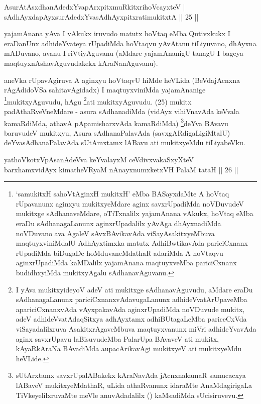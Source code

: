\begin{shl}
AsurAtAsxdhanAdedxYvapArxpitxmuRkitxrihoVcayxteV |\\
sAdhAyxdapAyxsurAdedxYvasAdhAyxpitxratimukitxtA \hfill || 25 ||
\end{shl}

\begin{artha}
yajamAnana yAva I vAkukx iruvudo matutx hoVtaq eMba Qutivxkukx I eraDanUnx adhideYvateya rUpadiMda hoVtaqvu yAvAtanu tiLiyuvano, dhAyxna mADuvano, avanu I riVtiyAguvanu (aMdare yajamAnanigU tanagU I bageya maqtuyxnAshavAguvudakekx kAraNanAguvanu).
\end{artha}

\begin{artha}
aneVka rUpavAgiruva A aginxyu hoVtaqvU hiMde heVLida (BeVdajAcnxna rAgAdidoVSa sahitavAgidadx) I maqtuyxviniMda yajamAnanige \footnote{`samukitxH sahoVtA\s ginxH mukitxH' eMba BASayxdaMte A hoVtaq rUpavanunx aginxyu mukitxyeMdare aginx savxrUpadiMda noVDuvudeV mukitxge sAdhanaveMdare, oTiTxnalilx yajamAnana vAkukx, hoVtaq eMba eraDu sAdhanagaLanunx aginxrUpadalilx yAvAga dhAyxnadiMda noVDuvano ava AgaleV sAvxBAvikavAda viSayAsakitxyeMbuva maqtuyxviniMdalU AdhAyxtimxka matutx AdhiBwtikavAda pariciCxnanx rUpadiMda biDugaDe hoMduvaneMdathaR adariMda A hoVtaqvu aginxrUpadiMda kaMDalilx yajamAnana maqtuyxveMba pariciCxnanx budidhxyiMda mukitxyAgalu sAdhanavAguvanu.}mukitxyAguvudu, hAgu \footnote{I yAva mukitxyideyoV adeV ati mukitxge sAdhanavAguvudu, aMdare eraDu sAdhanagaLanunx pariciCxnanxvAdavugaLanunx adhideVvatArUpaveMba apariciCxnanxvAda vAyxpakavAda aginxrUpadiMda noVDuvude mukitx, adeV adhideVvatAdaqSitxya adhAyxtamx adhiBUtagaLeMba pariceCxVda viSayadalilxruva AsakitxrAgaveMbuva maqtuyxvanunx miVri adhideYvavAda aginx savxrUpavu laBisuvudeMba PalarUpa BAvaveV ati mukitx, kAyaRkAraNa BAvadiMda aupacArikavAgi mukitxyeV ati mukitxyeMdu heVLide.}ati mukitxyAguvudu. (25) mukitx padAthaRveVneMdare - asura sAdhanadiMda (vidAyx vihiVnavAda keVvala kamaRdiMda, athavA pApamisharxvAda kamaRdiMda) \footnote{sUtArxtamx savxrUpalABakekx kAraNavAda jAcnxnakamaR samucacxya lABaveV mukitxyeMdathaR, uLida athaRvanunx idaraMte AnaMdagirigaLa TiVkeyelilxruvaMte meVle anuvAdadalilx (\quad) kaMsadiMda sUcisiruvevu.}deYva BAvavu baruvudeV mukitxyu, Asura sAdhanaPalavAda (savxgARdigaLigiMtalU) deYvasAdhanaPalavAda sUtAmxtamx lABavu ati mukitxyeMdu tiLiyabeVku.
\end{artha}


\begin{shl}
yathoVkotxVpAsanAdeVva keYvalayxM ceVdivxvakaSxyXteV |\\
barxhamxvidAyx kimatheVRyaM nAnayxnumxketxVH PalaM tataH \hfill || 26 ||
\end{shl}

